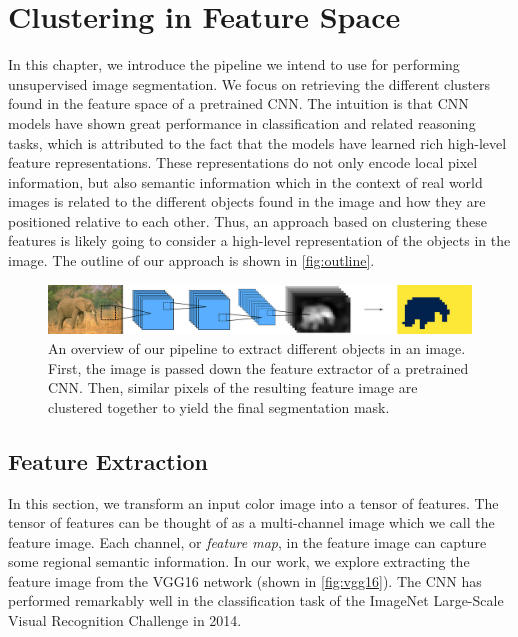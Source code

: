 \chapter{Clustering in Feature Space}\label{chapter:clustering_in_feature_space}

In this chapter, we introduce the pipeline we intend to use for performing unsupervised image segmentation. We focus on retrieving the different clusters found in the feature space of a pretrained CNN. The intuition is that CNN models have shown great performance in classification and related reasoning tasks, which is attributed to the fact that the models have learned rich high-level feature representations. These representations do not only encode local pixel information, but also semantic information which in the context of real world images is related to the different objects found in the image and how they are positioned relative to each other. Thus, an approach based on clustering these features is likely going to consider a high-level representation of the objects in the image. The outline of our approach is shown in \autoref{fig:outline}.
\begin{figure}[thbp]
    \centering
    \includegraphics[width=\linewidth]{figures/outline.pdf}
    \caption{An overview of our pipeline to extract different objects in an image. First, the image is passed down the feature extractor of a pretrained CNN. Then, similar pixels of the resulting feature image are clustered together to yield the final segmentation mask.}
    \label{fig:outline}
\end{figure}

\section{Feature Extraction}

In this section, we transform an input color image into a tensor of features. The tensor of features can be thought of as a multi-channel image which we call the feature image. Each channel, or \emph{feature map}, in the feature image can capture some regional semantic information. In our work, we explore extracting the feature image from the VGG16 network \parencite{simonyan2014very} (shown in \autoref{fig:vgg16}). The CNN has performed remarkably well in the classification task of the ImageNet Large-Scale Visual Recognition Challenge in 2014.

